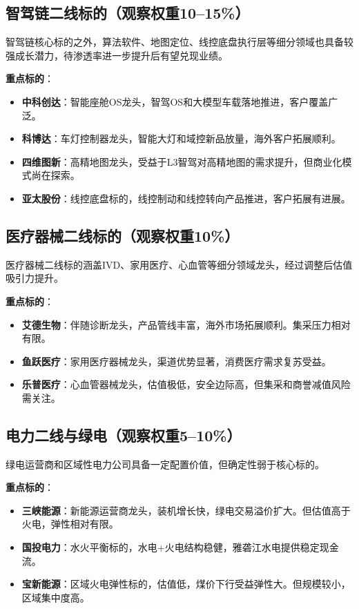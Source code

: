 \subsection{智驾链二线标的（观察权重10--15\%）}

智驾链核心标的之外，算法软件、地图定位、线控底盘执行层等细分领域也具备较强成长潜力，待渗透率进一步提升后有望兑现业绩。

\textbf{重点标的}：
\vspace{0.2em}
\begin{itemize}[leftmargin=2em]
\item \textbf{中科创达}：智能座舱OS龙头，智驾OS和大模型车载落地推进，客户覆盖广泛。
\item \textbf{科博达}：车灯控制器龙头，智能大灯和域控新品放量，海外客户拓展顺利。
\item \textbf{四维图新}：高精地图龙头，受益于L3智驾对高精地图的需求提升，但商业化模式尚在探索。
\item \textbf{亚太股份}：线控底盘标的，线控制动和线控转向产品推进，客户拓展有进展。
\end{itemize}

\subsection{医疗器械二线标的（观察权重10\%）}

医疗器械二线标的涵盖IVD、家用医疗、心血管等细分领域龙头，经过调整后估值吸引力提升。

\textbf{重点标的}：
\vspace{0.2em}
\begin{itemize}[leftmargin=2em]
\item \textbf{艾德生物}：伴随诊断龙头，产品管线丰富，海外市场拓展顺利。集采压力相对有限。
\item \textbf{鱼跃医疗}：家用医疗器械龙头，渠道优势显著，消费医疗需求复苏受益。
\item \textbf{乐普医疗}：心血管器械龙头，估值极低，安全边际高，但集采和商誉减值风险需关注。
\end{itemize}

\subsection{电力二线与绿电（观察权重5--10\%）}

绿电运营商和区域性电力公司具备一定配置价值，但确定性弱于核心标的。

\textbf{重点标的}：
\vspace{0.2em}
\begin{itemize}[leftmargin=2em]
\item \textbf{三峡能源}：新能源运营商龙头，装机增长快，绿电交易溢价扩大。但估值高于火电，弹性相对有限。
\item \textbf{国投电力}：水火平衡标的，水电+火电结构稳健，雅砻江水电提供稳定现金流。
\item \textbf{宝新能源}：区域火电弹性标的，估值低，煤价下行受益弹性大。但规模较小，区域集中度高。
\end{itemize}

